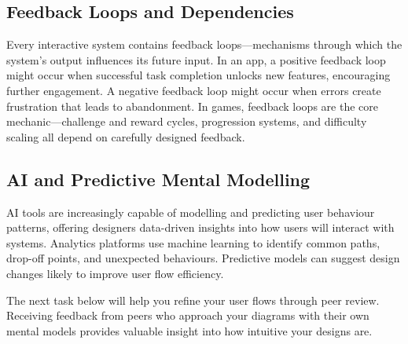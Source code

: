 \documentclass[12pt,a4paper]{article}
\begin{document}
\subsection*{Feedback Loops and Dependencies}
Every interactive system contains feedback loops—mechanisms through which the system’s output influences its future input. In an app, a positive feedback loop might occur when successful task completion unlocks new features, encouraging further engagement. A negative feedback loop might occur when errors create frustration that leads to abandonment. In games, feedback loops are the core mechanic—challenge and reward cycles, progression systems, and difficulty scaling all depend on carefully designed feedback.

\subsection*{AI and Predictive Mental Modelling}
AI tools are increasingly capable of modelling and predicting user behaviour patterns, offering designers data-driven insights into how users will interact with systems. Analytics platforms use machine learning to identify common paths, drop-off points, and unexpected behaviours. Predictive models can suggest design changes likely to improve user flow efficiency.

The next task below will help you refine your user flows through peer review. Receiving feedback from peers who approach your diagrams with their own mental models provides valuable insight into how intuitive your designs are.
\end{document}
